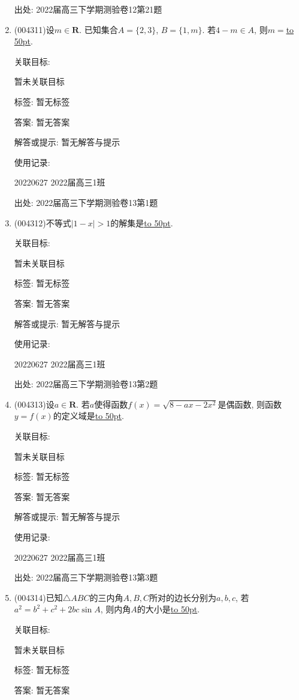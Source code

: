 \documentclass[10pt,a4paper]{article}
\newcommand{\blank}[1]{\underline{\hbox to #1pt{}}}
\begin{document}
\begin{enumerate}[1.]
出处: 2022届高三下学期测验卷12第21题
\item { (004311)}设$m\in \mathbf{R}$. 已知集合$A=\{2,3\}$, $B=\{1,m\}$. 若$4-m\in A$, 则$m=$\blank{50}.


关联目标:

暂未关联目标



标签: 暂无标签

答案: 暂无答案

解答或提示: 暂无解答与提示

使用记录:

20220627	2022届高三1班	


出处: 2022届高三下学期测验卷13第1题
\item { (004312)}不等式$|1-x|>1$的解集是\blank{50}.


关联目标:

暂未关联目标



标签: 暂无标签

答案: 暂无答案

解答或提示: 暂无解答与提示

使用记录:

20220627	2022届高三1班	


出处: 2022届高三下学期测验卷13第2题
\item { (004313)}设$a\in \mathbf{R}$. 若$a$使得函数$f(x)=\sqrt{8-ax-2x^2}$是偶函数, 则函数$y=f(x)$的定义域是\blank{50}.


关联目标:

暂未关联目标



标签: 暂无标签

答案: 暂无答案

解答或提示: 暂无解答与提示

使用记录:

20220627	2022届高三1班	


出处: 2022届高三下学期测验卷13第3题
\item { (004314)}已知$\triangle ABC$的三内角$A,B,C$所对的边长分别为$a,b,c$, 若$a^2=b^2+c^2+2bc\sin A$, 则内角$A$的大小是\blank{50}.


关联目标:

暂未关联目标



标签: 暂无标签

答案: 暂无答案


\end{enumerate}
\end{document}
